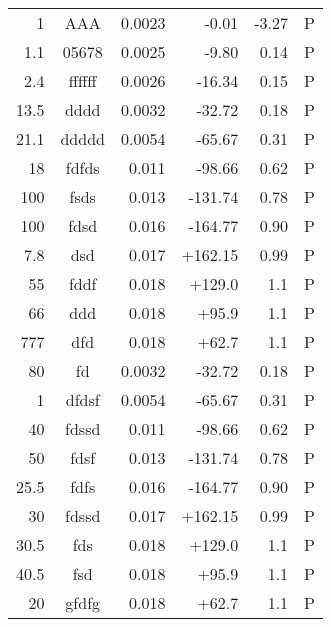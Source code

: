 \documentclass[IANZ]{MSLCalCert}
\begin{document}
\begin{longtable}{D{.}{.}{4}cD{.}{.}{4}D{.}{.}{4}D{.}{.}{4}c}
1 & AAA & 0.0023 & -0.01 & -3.27 & P\\
1.1 & 05678 & 0.0025 & -9.80 & 0.14 & P\\
2.4 & ffffff & 0.0026 & -16.34 & 0.15 & P\\
13.5 & dddd & 0.0032 & -32.72 & 0.18 & P\\
21.1 & ddddd & 0.0054 & -65.67 & 0.31 & P\\
18 & fdfds & 0.011 & -98.66 & 0.62 & P\\
100 & fsds & 0.013 & -131.74 & 0.78 & P\\
100 & fdsd & 0.016 & -164.77 & 0.90 & P\\
7.8 & dsd & 0.017 & +162.15 & 0.99 & P\\
55 & fddf & 0.018 & +129.0 & 1.1 & P\\
66 & ddd & 0.018 & +95.9 & 1.1 & P\\
777 & dfd & 0.018 & +62.7 & 1.1 & P\\
80 & fd & 0.0032 & -32.72 & 0.18 & P\\
1 & dfdsf & 0.0054 & -65.67 & 0.31 & P\\
40 & fdssd & 0.011 & -98.66 & 0.62 & P\\
50 & fdsf & 0.013 & -131.74 & 0.78 & P\\
25.5 & fdfs & 0.016 & -164.77 & 0.90 & P\\
30 & fdssd & 0.017 & +162.15 & 0.99 & P\\
30.5 & fds & 0.018 & +129.0 & 1.1 & P\\
40.5 & fsd & 0.018 & +95.9 & 1.1 & P\\
20 & gfdfg & 0.018 & +62.7 & 1.1 & P\\

\end{longtable}
 
\end{document}
